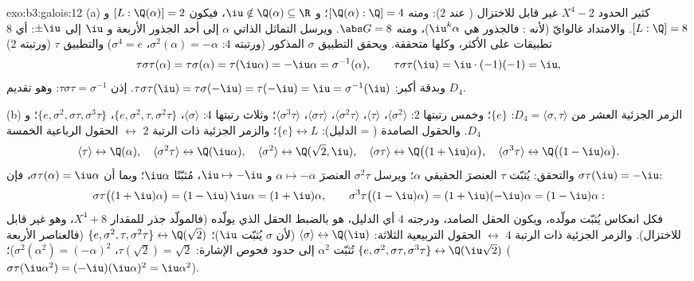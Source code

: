 \begin{solution}{exo:b3:galois:12}
(a) كثير الحدود $X^4 - 2$ غير قابل للاختزال ( عند
$2$): ومنه $[\Q(\alpha):\Q] = 4$؛ و $\iu \notin \Q(\alpha) \subseteq \R$، فيكون $[L : \Q(\alpha)] = 2$ و $[L:\Q] = 8$.
والامتداد غالوايّ (لأنه  :
فالجذور هي $\iu^k\alpha$)، ومنه $\abs G = 8$. ويرسل التماثل
الذاتي $\alpha$ إلى أحد الجذور الأربعة و $\iu$ إلى $\pm\iu$: أي
$8$ تطبيقات على الأكثر، وكلها متحققة. ويحقق التطبيق $\sigma$
المذكور (ورتبته $4$: $\sigma^2(\alpha) = -\alpha$، $\sigma^4 = e$) والتطبيق $\tau$
(ورتبته $2$)
\[
\tau\sigma\tau(\alpha) = \tau\sigma(\alpha) =
\tau(\iu\alpha) = -\iu\alpha = \sigma^{-1}(\alpha),
\qquad \tau\sigma\tau(\iu) = \iu\cdot(-1)(-1) = \iu ,
\]
وبدقة أكبر: $\tau\sigma\tau(\iu) = \tau\sigma(-\iu) =
\tau(-\iu) = \iu = \sigma^{-1}(\iu)$. إذن $\tau\sigma\tau =
\sigma^{-1}$: وهو تقديم $D_4$.

(b) الزمر الجزئية العشر من $D_4 = \langle\sigma,
\tau\rangle$: $\{e\}$؛ وخمس رتبتها $2$:
$\langle\sigma^2\rangle$، $\langle\tau\rangle$، $\langle\sigma^2\tau\rangle$، $\langle\sigma\tau\rangle$، $\langle\sigma^3\tau\rangle$؛ وثلاث رتبتها $4$:
$\langle\sigma\rangle$، $\{e, \sigma^2, \tau,
\sigma^2\tau\}$، $\{e, \sigma^2, \sigma\tau,
\sigma^3\tau\}$؛ و $D_4$. والحقول الصامدة ( =
الدليل): $\{e\} \leftrightarrow L$؛ والزمر الجزئية ذات الرتبة $2$ $\leftrightarrow$ الحقول
الرباعية الخمسة
\[
\langle\tau\rangle \leftrightarrow \Q(\alpha),\quad
\langle\sigma^2\tau\rangle \leftrightarrow \Q(\iu\alpha),
\quad
\langle\sigma^2\rangle \leftrightarrow \Q(\sqrt2, \iu),\quad
\langle\sigma\tau\rangle \leftrightarrow
\Q\bigl((1+\iu)\alpha\bigr),\quad
\langle\sigma^3\tau\rangle \leftrightarrow
\Q\bigl((1-\iu)\alpha\bigr) .
\]
والتحقق: يُثبّت $\tau$ العنصرَ الحقيقي $\alpha$؛ ويرسل
$\sigma^2\tau$ العنصرَ $\alpha \mapsto -\alpha$ و $\iu \mapsto -\iu$، مُثبّتًا $\iu\alpha$؛
وبما أن $\sigma\tau(\alpha) = \iu\alpha$، فإن $\sigma\tau(\iu) = -\iu$:
\[
\sigma\tau\bigl((1+\iu)\alpha\bigr) =
(1 - \iu)\,\iu\alpha = (1 + \iu)\alpha,
\qquad
\sigma^3\tau\bigl((1-\iu)\alpha\bigr) =
(1 + \iu)(-\iu)\alpha = (1 - \iu)\alpha :
\]
فكل انعكاس يُثبّت مولّده، ويكون الحقل الصامد، ودرجته $4$ أي الدليل، هو بالضبط الحقل الذي يولّده (فالمولّد جذر للمقدار $X^4 + 8$،
وهو غير قابل للاختزال). والزمر الجزئية ذات الرتبة $4$ $\leftrightarrow$
الحقول التربيعية الثلاثة: $\langle\sigma\rangle \leftrightarrow \Q(\iu)$ (لأن $\sigma$ يُثبّت $\iu$)؛
$\{e, \sigma^2, \tau, \sigma^2\tau\}
\leftrightarrow \Q(\sqrt2)$ (فالعناصر الأربعة تُثبّت $\alpha^2$ إلى حدود فحوص
الإشارة: $\tau(\sqrt2) = \sqrt2$، $\sigma^2(\alpha^2) =
(-\alpha)^2$)؛ $\{e, \sigma^2, \sigma\tau, \sigma^3\tau\}
\leftrightarrow \Q(\iu\sqrt2)$ ($\sigma\tau(\iu\alpha^2) =
(-\iu)(\iu\alpha)^2 = \iu\alpha^2$).


\end{solution}
